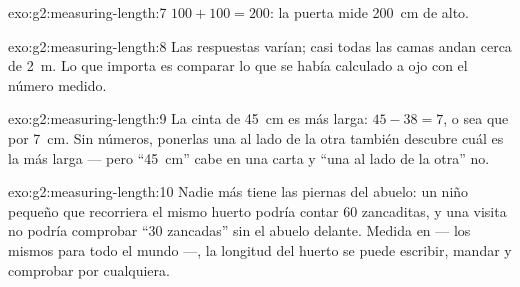 \begin{solution}{exo:g2:measuring-length:7}
$100 + 100 = 200$: la puerta mide \qty{200}{cm} de alto.
\end{solution}

\begin{solution}{exo:g2:measuring-length:8}
Las respuestas varían; casi todas las camas andan cerca de
\qty{2}{m}. Lo que importa es comparar lo que se había calculado a ojo
con el número medido.
\end{solution}

\begin{solution}{exo:g2:measuring-length:9}
La cinta de \qty{45}{cm} es más larga: $45 - 38 = 7$, o sea que por
\qty{7}{cm}. Sin números, ponerlas una al lado de la otra también
descubre cuál es la más larga --- pero ``\qty{45}{cm}'' cabe en una
carta y ``una al lado de la otra'' no.
\end{solution}

\begin{solution}{exo:g2:measuring-length:10}
Nadie más tiene las piernas del abuelo: un niño pequeño que recorriera
el mismo huerto podría contar $60$ zancaditas, y una visita no podría
comprobar ``$30$ zancadas'' sin el abuelo delante. Medida en
 --- los mismos para todo el mundo ---, la longitud del huerto
se puede escribir, mandar y comprobar por cualquiera.
\end{solution}
